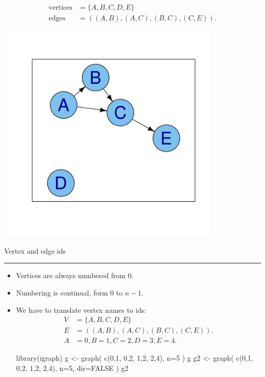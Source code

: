 \documentclass[landscape,fleqno]{foils}
\newcommand{\stitle}[1]{{\color{blue}\Large #1\par\vspace*{10pt}\hrule}}
\newenvironment{narrow}[2]{%
  \begin{list}{}{%
      \setlength{\topsep}{0pt}%
      \setlength{\leftmargin}{#1}%
      \setlength{\rightmargin}{#2}%
      \setlength{\listparindent}{\parindent}%
      \setlength{\itemindent}{\parindent}%
      \setlength{\parsep}{\parskip}}%
    \item[]}{\end{list}}
\begin{document}
\begin{itemize}
  \begin{minipage}{0.7\textwidth}
    \begin{align} 
      \text{vertices} & =\{A,B,C,D,E\} \nonumber\\
      \text{edges}    & =( (A,B),(A,C),(B,C),(C,E) ). \nonumber
    \end{align}
  \end{minipage}\begin{minipage}{0.3\textwidth}
    \includegraphics[width=0.8\textwidth]{../images/small4}
  \end{minipage}
\end{itemize}

\newpage
\stitle{Vertex and edge ids}
\begin{narrow}{0cm}{13.5cm}
\begin{itemize}
\item Vertices are always numbered from 0.
\item Numbering is continual, form 0 to $n-1$. \pause
\item We have to translate vertex names to ids: 
\begin{align} 
  V & =\{A,B,C,D,E\} \nonumber\\
  E & =( (A,B),(A,C),(B,C),(C,E) ). \nonumber\\
  A & =0, B=1, C=2, D=3, E=4. \nonumber
\end{align}\vspace*{-2cm}\pause
\begin{Myverb}
  library(igraph)
  g <- graph( c(0,1, 0,2, 1,2, 2,4), n=5 )
  g
  g2 <- graph( c(0,1, 0,2, 1,2, 2,4), 
               n=5, dir=FALSE )
  g2
\end{Myverb}
\end{itemize}
\end{narrow}
\end{document}
